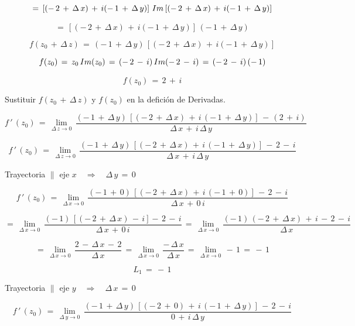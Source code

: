 \documentclass[a4paper,11pt,openany]{book}
\begin{document}
$$=\,\left[(-\,2\,+\,\Delta\,x)\,+\,i(-\,1\,+\,\Delta\,y)\right]\,\mathnormal{Im}\left[(-\,2\,+\,\Delta\,x)\,+\,i(-\,1\,+\,\Delta\,y)\right]$$

$$=\,\left[(-\,2\,+\,\Delta\,x)\,+\,i(-\,1\,+\,\Delta\,y)\right]\,(-\,1\,+\,\Delta\,y)$$

$$f(z_{0}\,+\,\Delta\,z)\,=\,(-\,1\,+\,\Delta\,y)\,\left[(-\,2\,+\,\Delta\,x)\,+\,i(-\,1\,+\,\Delta\,y)\right]$$

$$f(z_{0})\,=\,z_{0}\,\mathnormal{Im}(z_{0})\,=\,(-\,2\,-\,i)\,\mathnormal{Im}(-\,2\,-\,i)\,=\,(-\,2\,-\,i)\,(-\,1)$$

$$f(z_{0})\,=\,2\,+\,i$$

\textcolor{ao(english)}{} Sustituir  $f(z_{0}\,+\,\Delta\,z)$ y $f(z_{0})$ en la defición de Derivadas.

$$f\,'\,(z_{0})\,=\,\displaystyle\lim_{\Delta\,z \to 0}\,\dfrac{(-\,1\,+\,\Delta\,y)\,\left[(-\,2\,+\,\Delta\,x)\,+\,i\,(-\,1\,+\,\Delta\,y)\right]\,-\,(2\,+\,i)}{\Delta\,x\,+\,i\,\Delta\,y}$$

$$f\,'\,(z_{0})\,=\,\displaystyle\lim_{\Delta\,z \to 0}\,\dfrac{(-\,1\,+\,\Delta\,y)\,\left[(-\,2\,+\,\Delta\,x)\,+\,i\,(-\,1\,+\,\Delta\,y)\right]\,-\,2\,-\,i}{\Delta\,x\,+\,i\,\Delta\,y}$$

\textcolor{ao(english)}{} Trayectoria $\parallel$ eje $x \quad\Rightarrow\quad \Delta\,y\,=\,0$

$$f\,'\,(z_{0})\,=\,\displaystyle\lim_{\Delta\,x \to 0}\,\dfrac{(-\,1\,+\,0)\,\left[(-\,2\,+\,\Delta\,x)\,+\,i\,(-\,1\,+\,0)\right]\,-\,2\,-\,i}{\Delta\,x\,+\,0\,i}$$

$$=\,\displaystyle\lim_{\Delta\,x \to 0}\,\dfrac{(-\,1)\,\left[(-\,2\,+\,\Delta\,x)\,-\,i\right]-\,2\,-\,i}{\Delta\,x\,+\,0\,i}\,=\,\displaystyle\lim_{\Delta\,x \to 0}\,\dfrac{(-\,1)\,(-\,2\,+\,\Delta\,x)\,+\,i\,-\,2\,-\,i}{\Delta\,x}$$

$$=\,\displaystyle\lim_{\Delta\,x \to 0}\,\dfrac{2\,-\,\Delta\,x\,-\,2}{\Delta\,x}\,=\,\displaystyle\lim_{\Delta\,x \to 0}\,\dfrac{-\,\Delta\,x}{\Delta\,x}\,=\,\displaystyle\lim_{\Delta\,x \to 0}\,-\,1\,=\,-\,1$$

$$L_{1}\,=\,-\,1$$

\textcolor{ao(english)}{} Trayectoria $\parallel$ eje $y \quad\Rightarrow\quad \Delta\,x\,=\,0$

$$f\,'\,(z_{0})\,=\,\displaystyle\lim_{\Delta\,y \to 0}\,\dfrac{(-\,1\,+\,\Delta\,y)\,\left[(-\,2\,+\,0)\,+\,i\,(-\,1\,+\,\Delta\,y)\right]\,-\,2\,-\,i}{0\,+\,i\,\Delta\,y}$$
\end{document}
